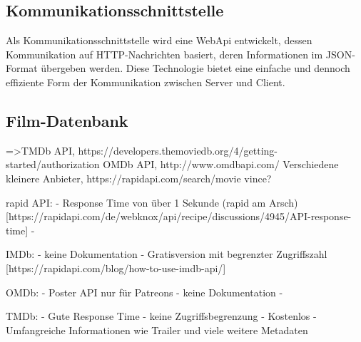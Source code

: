 \subsection{Kommunikationsschnittstelle}
Als Kommunikationsschnittstelle wird eine WebApi entwickelt, dessen Kommunikation auf HTTP-Nachrichten basiert, deren Informationen im JSON-Format übergeben werden. Diese Technologie bietet eine einfache und dennoch effiziente Form der Kommunikation zwischen Server und Client.

\subsection{Film-Datenbank}
\label{sec:filmdatenbank}
=>TMDb API, https://developers.themoviedb.org/4/getting-started/authorization\newline
OMDb API, http://www.omdbapi.com/\newline
Verschiedene kleinere Anbieter, https://rapidapi.com/search/movie\newline
vince?
\newline

rapid API:
- Response Time von über 1 Sekunde (rapid am Arsch) [https://rapidapi.com/de/webknox/api/recipe/discussions/4945/API-response-time]
- 

IMDb:
- keine Dokumentation
- Gratisversion mit begrenzter Zugriffszahl [https://rapidapi.com/blog/how-to-use-imdb-api/]

OMDb:
- Poster API nur für Patreons 
- keine Dokumentation
- 

TMDb:
- Gute Response Time
- keine Zugriffsbegrenzung
- Kostenlos
- Umfangreiche Informationen wie Trailer und viele weitere Metadaten